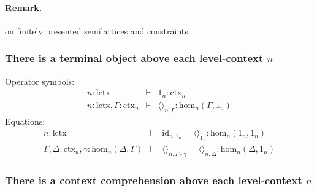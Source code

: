 \documentclass[11pt,a4paper]{article}
\theoremstyle{definition}
\newcommand{\id}{\mathsf{id}}
\newcommand{\UU}{\mathsf{U}}
\def\UU{\mathsf{U}}
\def\Hom{\mathrm{hom}}
\def\id{\mathrm{id}}
\def\lctx{\mathrm{lctx}}
\newcommand{\ctx}{\mathrm{ctx}}
\newcommand{\tuple}[1]{\langle #1 \rangle}
\def\L{{\mathcal{L}}}
\def\CwF{\mathrm{CwF}}
\begin{document}
\paragraph{Remark.} on finitely presented semilattices and constraints.




\subsubsection{There is a terminal object above each level-context $n$}

Operator symbols:
\begin{eqnarray*}
n : \lctx &\vdash& 1_n : \ctx_n\\
n : \lctx, \Gamma : \ctx_n &\vdash& \tuple{}_{n,\Gamma} : \Hom_n(\Gamma,1_n)
\end{eqnarray*}
Equations:
\begin{eqnarray*}
n : \lctx &\vdash& \id_{n,1_n} = \tuple{}_{1_n} : \Hom_n(1_n,1_n)\\
\Gamma,\Delta : \ctx_n , \gamma : \Hom_n (\Delta,\Gamma) &\vdash&
\tuple{}_{n,\Gamma\circ\gamma} = \tuple{}_{n,\Delta} : \Hom_n (\Delta,1_n )
\end{eqnarray*}


\subsubsection{There is a context comprehension above each level-context $n$}
\end{document}

